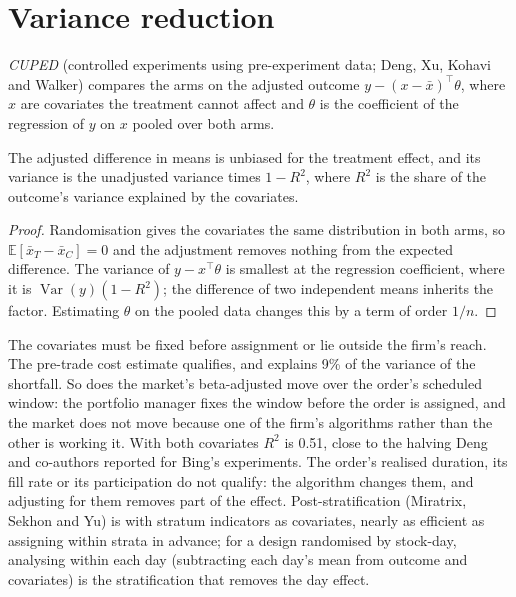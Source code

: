 \label{lst:rs:live-experiments:cluster}

\section{Variance reduction}

\begin{definition}[CUPED]\label{def:rs:live-experiments:cuped}
\emph{CUPED} (controlled experiments using pre-experiment data; Deng, Xu, Kohavi and Walker) compares the arms on the adjusted outcome
$y - (x - \bar x)^\top\theta$, where $x$ are covariates the treatment cannot affect and $\theta$ is the coefficient of the regression of $y$ on $x$ pooled over
both arms.
\end{definition}

\begin{proposition}\label{prop:rs:live-experiments:cuped}
The adjusted difference in means is unbiased for the treatment effect, and its variance is the unadjusted variance times $1 - R^2$, where $R^2$ is the share of
the outcome's variance explained by the covariates.
\end{proposition}

\begin{proof}
Randomisation gives the covariates the same distribution in both arms, so $\mathbb{E}[\bar x_T - \bar x_C] = 0$ and the adjustment removes nothing from the
expected difference. The variance of $y - x^\top\theta$ is smallest at the regression coefficient, where it is $\operatorname{Var}(y)(1 - R^2)$; the difference
of two independent means inherits the factor. Estimating $\theta$ on the pooled data changes this by a term of order $1/n$.
\end{proof}

The covariates must be fixed before assignment or lie outside the firm's reach. The pre-trade cost estimate qualifies, and explains 9\% of the variance of the
shortfall. So does the market's beta-adjusted move over the order's scheduled window: the portfolio manager fixes the window before the order is
assigned, and the market does not move because one of the firm's algorithms rather than the other is working it. With both covariates $R^2$ is 0.51, close
to the halving Deng and co-authors reported for Bing's experiments. The order's realised duration, its fill rate or its participation do not qualify: the
algorithm changes them, and adjusting for them removes part of the effect. Post-stratification (Miratrix, Sekhon and Yu) is  with stratum indicators as
covariates, nearly as efficient as assigning within strata in advance; for a design randomised by stock-day, analysing within each day (subtracting each day's
mean from outcome and covariates) is the stratification that removes the day effect.

